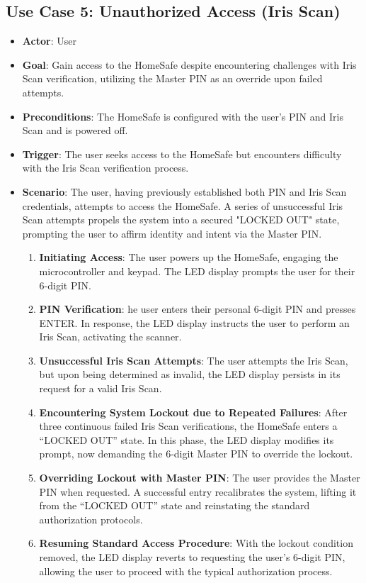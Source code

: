 \documentclass{article}
\begin{document}
\subsection{Use Case 5: Unauthorized Access (Iris Scan)}
\begin{itemize}
    \item \textbf{Actor}: User
    \item \textbf{Goal}: Gain access to the HomeSafe despite encountering challenges with Iris Scan verification, utilizing the Master PIN as an override upon failed attempts.
    \item \textbf{Preconditions}:  The HomeSafe is configured with the user’s PIN and Iris Scan and is powered off.
    \item \textbf{Trigger}: The user seeks access to the HomeSafe but encounters difficulty with the Iris Scan verification process.
    \item \textbf{Scenario}: The user, having previously established both PIN and Iris Scan credentials, attempts to access the HomeSafe. A series of unsuccessful Iris Scan attempts propels the system into a secured "LOCKED OUT" state, prompting the user to affirm identity and intent via the Master PIN.
    \begin{enumerate}
    \item \textbf{Initiating Access}: The user powers up the HomeSafe, engaging the microcontroller and keypad. The LED display prompts the user for their 6-digit PIN.
    \item \textbf{PIN Verification}: he user enters their personal 6-digit PIN and presses ENTER. In response, the LED display instructs the user to perform an Iris Scan, activating the scanner.
    \item \textbf{Unsuccessful Iris Scan Attempts}: The user attempts the Iris Scan, but upon being determined as invalid, the LED display persists in its request for a valid Iris Scan.
    \item \textbf{Encountering System Lockout due to Repeated Failures}: After three continuous failed Iris Scan verifications, the HomeSafe enters a “LOCKED OUT” state. In this phase, the LED display modifies its prompt, now demanding the 6-digit Master PIN to override the lockout.
    \item \textbf{Overriding Lockout with Master PIN}: The user provides the Master PIN when requested. A successful entry recalibrates the system, lifting it from the “LOCKED OUT” state and reinstating the standard authorization protocols.
    \item \textbf{Resuming Standard Access Procedure}: With the lockout condition removed, the LED display reverts to requesting the user’s 6-digit PIN, allowing the user to proceed with the typical authorization process.
    \end{enumerate}
\end{itemize}

\newpage

\printbibliography

{\parindent0pt}
\end{document}
